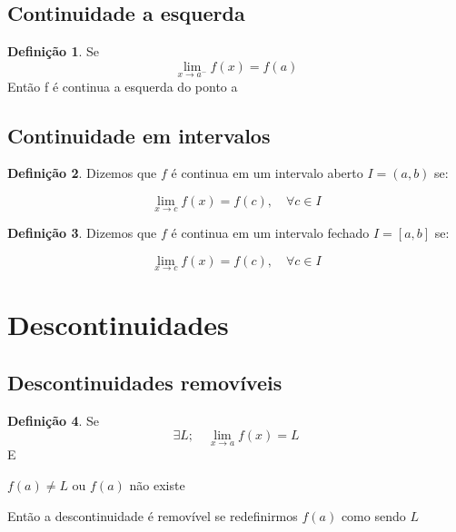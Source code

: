 \documentclass[14pt]{extreport}
\theoremstyle{definition}
\newtheorem{definition}{Definição}
\begin{document}
\subsection{Continuidade a esquerda}

\begin{definition}
    Se
    \begin{equation}
       \lim_{x \to a^-} f(x) = f(a)  
    \end{equation}
    Então f é continua a esquerda do ponto a
\end{definition}

\subsection{Continuidade em intervalos}

\begin{definition}
    Dizemos que \(f\) é continua em um intervalo aberto \( I = (a, b)\) se:
    
    \begin{equation}
       \lim_{x \to c} f(x) = f(c),\quad \forall c \in I
    \end{equation}
    
\end{definition}

\begin{definition}
    Dizemos que \(f\) é continua em um intervalo fechado \( I = [a, b]\) se:
    
    \begin{equation}
       \lim_{x \to c} f(x) = f(c),\quad \forall c \in I
    \end{equation}
    
\end{definition}


\section{Descontinuidades}

\subsection{Descontinuidades removíveis}

\begin{definition}
    Se
    \begin{equation*}
        \exists L; \quad \lim_{x \to a} f(x) = L
    \end{equation*}
    E
    \begin{center}
        \(f(a) \neq L\) ou \(f(a)\) não existe
    \end{center}
    Então a descontinuidade é removível se redefinirmos \(f(a)\) como sendo \(L\)
\end{definition}
\end{document}
